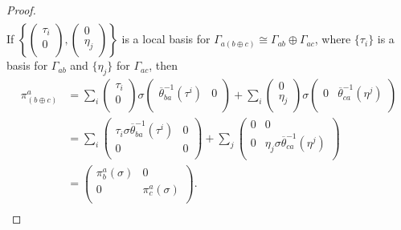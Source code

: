 \begin{proof}
$$\begin{aligned}
\end{aligned}
$$
If $\left \{\left (\begin{smallmatrix} \tau_i \\ 0 \\ \end{smallmatrix} \right ), \left (\begin{smallmatrix} 0 \\ \eta_j \\ \end{smallmatrix} \right )\right \}$ is a local basis for $\Gamma_{a(b\oplus c)}\cong \Gamma_{ab}\oplus \Gamma_{ac}$, where $\{\tau_i\}$ is a basis for $\Gamma_{ab}$ and $\{\eta_j\}$ for $\Gamma_{ac}$, then
$$
\begin{aligned}
\pi^a_{(b\oplus c)} &= \sum_i\left (\begin{smallmatrix} \tau_i \\ 0 \\ \end{smallmatrix} \right )\sigma \left (\begin{smallmatrix} \overline{\theta}^{-1}_{ba}(\tau^i) & 0 \\ \end{smallmatrix} \right ) + \sum_i\left (\begin{smallmatrix} 0 \\ \eta_j \\ \end{smallmatrix} \right )\sigma \left (\begin{smallmatrix} 0 & \overline{\theta}^{-1}_{ca}(\eta^j) \\ \end{smallmatrix} \right ) \\
									  &= \sum_i \left (\begin{smallmatrix} \tau_i\sigma \overline{\theta}^{-1}_{ba}(\tau^i) & 0 \\ 0 & 0 \\ \end{smallmatrix} \right ) + \sum_j \left (\begin{smallmatrix} 0 & 0 \\ 0 & \eta_j\sigma \overline{\theta}^{-1}_{ca}(\eta^j) \\ \end{smallmatrix} \right ) \\
										&= \left (\begin{smallmatrix} \pi^a_b(\sigma ) & 0 \\ 0 & \pi^ a_c(\sigma ) \\ \end{smallmatrix} \right ). \\
\end{aligned}
$$
\end{proof}



